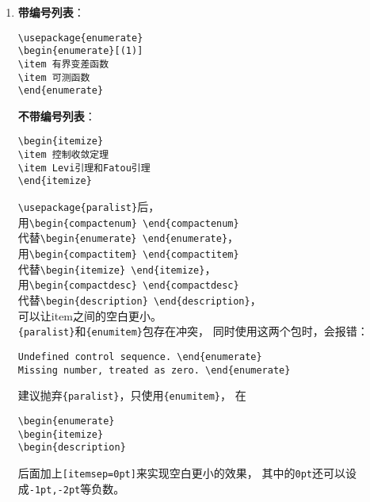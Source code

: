 \documentclass{article}
\begin{document}
\begin{multicols}{2}
\begin{enumerate}
        \item \textbf{带编号列表}：
              \begin{lstlisting}
\usepackage{enumerate}
\begin{enumerate}[(1)]
\item 有界变差函数
\item 可测函数
\end{enumerate}
\end{lstlisting}
              \textbf{不带编号列表}：
              \begin{lstlisting}
\begin{itemize}
\item 控制收敛定理
\item Levi引理和Fatou引理
\end{itemize}
\end{lstlisting}
              \verb|\usepackage{paralist}|后，\\
              用\verb|\begin{compactenum} \end{compactenum}|\\
              代替\verb|\begin{enumerate} \end{enumerate}|，\\
              用\verb|\begin{compactitem} \end{compactitem}|\\
              代替\verb|\begin{itemize} \end{itemize}|，\\
              用\verb|\begin{compactdesc} \end{compactdesc}|\\
              代替\verb|\begin{description} \end{description}|，\\
              可以让item之间的空白更小。\\
              \verb|{paralist}|和\verb|{enumitem}|包存在冲突，
              同时使用这两个包时，会报错：
              \begin{lstlisting}
Undefined control sequence. \end{enumerate}
Missing number, treated as zero. \end{enumerate}   
\end{lstlisting}
              建议抛弃\verb|{paralist}|，只使用\verb|{enumitem}|，
              在
              \begin{lstlisting}
\begin{enumerate}
\begin{itemize}
\begin{description}     
\end{lstlisting}
              后面加上\verb|[itemsep=0pt]|来实现空白更小的效果，
              其中的\verb|0pt|还可以设成\verb|-1pt,-2pt|等负数。


\end{enumerate}
\end{multicols}
\end{document}
